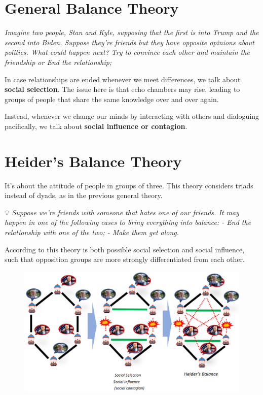 \documentclass[
  notitlepage,
  onecolumn,
  openany]{book}
\begin{document}
\hypertarget{general-balance-theory}{%
\section{General Balance Theory}\label{general-balance-theory}}

\emph{Imagine two people, Stan and Kyle, supposing that the first is into Trump and the second into Biden. Suppose they're friends but they have opposite opinions about politics. What could happen next? Try to convince each other and maintain the friendship or End the relationship;}

In case relationships are ended whenever we meet differences, we talk about \textbf{social selection}. The issue here is that echo chambers may rise, leading to groups of people that share the same knowledge over and over again.

Instead, whenever we change our minds by interacting with others and dialoguing pacifically, we talk about \textbf{social influence or contagion}.

\hypertarget{heiders-balance-theory}{%
\section{Heider's Balance Theory}\label{heiders-balance-theory}}

It's about the attitude of people in groups of three. This theory considers triads instead of dyads, as in the previous general theory.

💡 \emph{Suppose we're friends with someone that hates one of our friends. It may happen in one of the following cases to bring everything into balance:
- End the relationship with one of the two;
- Make them get along.}

According to this theory is both possible social selection and social influence, such that opposition groups are more strongly differentiated from each other.

\begin{figure}[h!]

{\centering \includegraphics[width=0.5\linewidth]{images/07-Triads and structural holes/Untitled} 

}

\end{figure}
\end{document}
